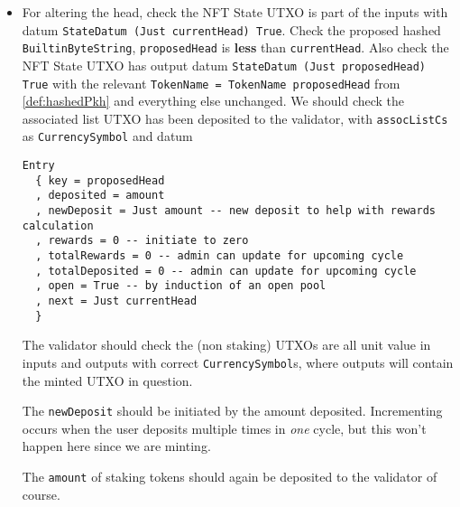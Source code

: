 \documentclass[10pt, a4paper]{article}
\theoremstyle{definition}
\begin{document}
\begin{enumerate}
{\begin{itemize}
{The \texttt{amount} of staking UTXOs should be deposited to the validator of course.

Note: the initial head stake is equivalent to an initial tail stake so do not define the latter.
}

\item{
For altering the head, check the NFT State UTXO is part of the inputs with datum \texttt{StateDatum (Just currentHead) True}. Check the proposed hashed \texttt{BuiltinByteString}, \texttt{proposedHead} is \textbf{less} than \texttt{currentHead}. Also check the NFT State UTXO has output datum \texttt{StateDatum (Just proposedHead) True} with the relevant \texttt{TokenName = TokenName proposedHead} from \ref{def:hashedPkh} and everything else unchanged. We should check the associated list UTXO has been deposited to the validator, with \texttt{assocListCs} as \texttt{CurrencySymbol} and datum
\begin{verbatim}
Entry
  { key = proposedHead
  , deposited = amount
  , newDeposit = Just amount -- new deposit to help with rewards calculation
  , rewards = 0 -- initiate to zero
  , totalRewards = 0 -- admin can update for upcoming cycle
  , totalDeposited = 0 -- admin can update for upcoming cycle
  , open = True -- by induction of an open pool
  , next = Just currentHead
  }
\end{verbatim}
The validator should check the (non staking) UTXOs are all unit value in inputs and outputs with correct \texttt{CurrencySymbol}s, where outputs will contain the minted UTXO in question.

The \texttt{newDeposit} should be initiated by the amount deposited. Incrementing occurs when the user deposits multiple times in \textit{one} cycle, but this won't happen here since we are minting.

The \texttt{amount} of staking tokens should again be deposited to the validator of course.
}

\end{itemize} 

}
\end{enumerate}
\end{document}
